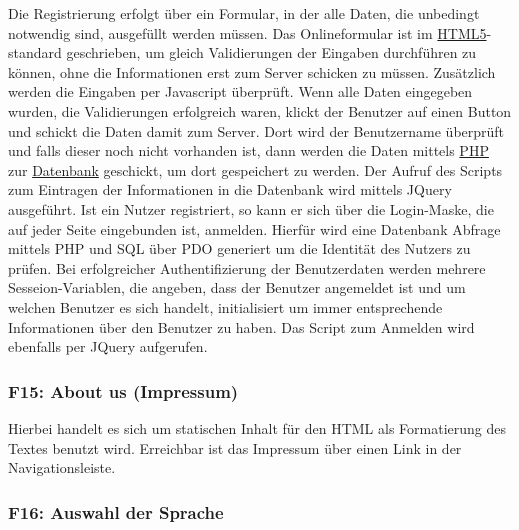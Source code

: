 \documentclass[10pt,a4paper]{scrartcl}
\begin{document}
Die Registrierung erfolgt über ein Formular, in der alle Daten, die unbedingt notwendig sind, ausgefüllt werden müssen. Das Onlineformular ist im \underline{HTML5}-standard geschrieben, um gleich Validierungen der Eingaben durchführen zu können, ohne die Informationen erst zum Server schicken zu müssen. Zus\"atzlich werden die Eingaben per Javascript \"uberpr\"uft. Wenn alle Daten eingegeben wurden, die Validierungen erfolgreich waren, klickt der Benutzer auf einen Button und schickt die Daten damit zum Server. Dort wird der Benutzername \"uberpr\"uft und falls dieser noch nicht vorhanden ist, dann werden die Daten mittels \underline{PHP} zur \underline{Datenbank} geschickt, um dort gespeichert zu werden. Der Aufruf des Scripts zum Eintragen der Informationen in die Datenbank wird mittels JQuery ausgef\"uhrt.
\bigskip
\newline
Ist ein Nutzer registriert, so kann er sich über die Login-Maske, die auf jeder Seite eingebunden ist, anmelden. Hierfür wird eine Datenbank Abfrage mittels PHP und SQL über PDO generiert um die Identität des Nutzers zu prüfen. Bei erfolgreicher Authentifizierung der Benutzerdaten werden mehrere Sesseion-Variablen, die angeben, dass der Benutzer angemeldet ist und um welchen Benutzer es sich handelt, initialisiert um immer entsprechende Informationen über den Benutzer zu haben. Das Script zum Anmelden wird ebenfalls per JQuery aufgerufen.

\subsubsection*{F15: About us (Impressum)}

Hierbei handelt es sich um statischen Inhalt für den HTML als Formatierung des Textes benutzt wird. Erreichbar ist das Impressum über einen Link in der Navigationsleiste.

%

\subsubsection*{F16: Auswahl der Sprache}
\end{document}
